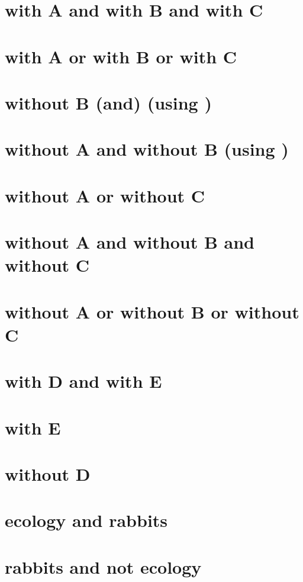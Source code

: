\documentclass{article}
\begin{document}
\section*{with A and with B and with C}
\section*{with A or with B or with C}
\section*{without B (and) (using \string\tableoftaggedcontents)}
\section*{without A and without B (using \string\tableoftaggedcontents)}
\section*{without A or without C}
\section*{without A and without B and without C}
\section*{without A or without B or without C}
\section*{with D and with E}
\section*{with E}
\section*{without D}
\section*{ecology and rabbits}
\section*{rabbits and not ecology}
\end{document}
